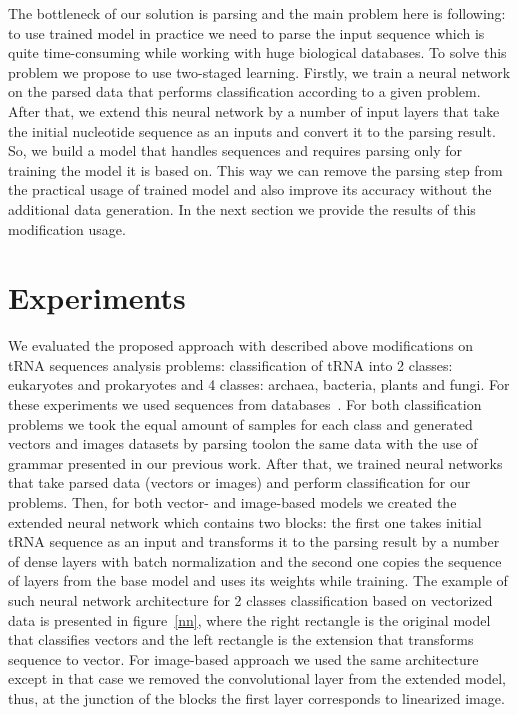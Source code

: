 \documentclass[12pt,a4paper]{cibb}
\begin{document}
The bottleneck of our solution is parsing and the main problem here is following: to use trained model in practice we need to parse the input sequence which is quite time-consuming while working with huge biological databases. To solve this problem we propose to use two-staged learning. Firstly, we train a neural network on the parsed data that performs classification according to a given problem. After that, we extend this neural network by a number of input layers that take the initial nucleotide sequence as an inputs and convert it to the parsing result. So, we build a model that handles sequences and requires parsing only for training the model it is based on. This way we can remove the parsing step from the practical usage of trained model and also improve its accuracy without the additional data generation. In the next section we provide the results of this modification usage.


\section{\bf Experiments}
We evaluated the proposed approach with described above modifications on tRNA sequences analysis problems: classification of tRNA into 2 classes: eukaryotes and prokaryotes and 4 classes: archaea, bacteria, plants and fungi. For these experiments we used sequences from databases~\cite{trnadb1,trnadb2}. For both classification problems we took the equal amount of samples for each class and generated vectors and images datasets by parsing toolon the same data with the use of grammar presented in our previous work. After that, we trained neural networks that take parsed data (vectors or images) and perform classification for our problems. Then, for both vector- and image-based models we created the extended neural network which contains two blocks: the first one takes initial tRNA sequence as an input and transforms it to the parsing result by a number of dense layers with batch normalization and the second one copies the sequence of layers from the base model and uses its weights while training. The example of such neural network architecture for 2 classes classification based on vectorized data is presented in figure~\ref{nn}, where the right rectangle is the original model that classifies vectors and the left rectangle is the extension that transforms sequence to vector. For image-based approach we used the same architecture except in that case we removed the convolutional layer from the extended model, thus, at the junction of the blocks the first layer corresponds to linearized image.
\end{document}
